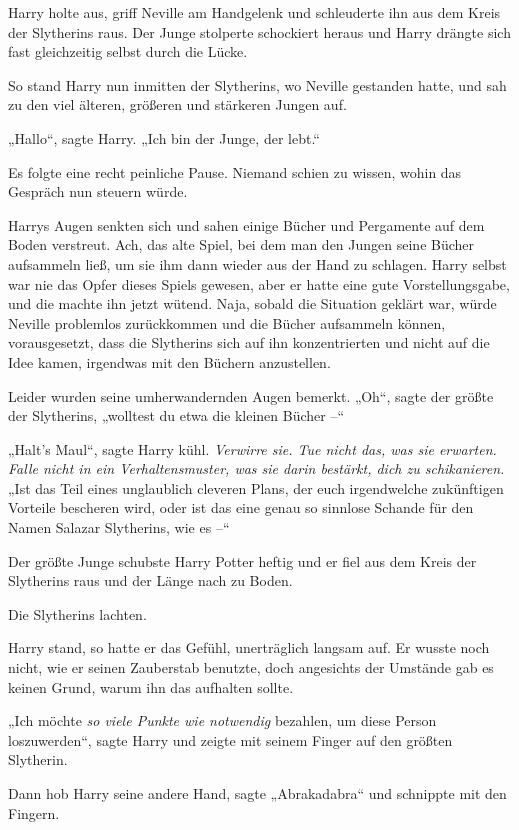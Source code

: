Harry holte aus, griff Neville am Handgelenk und schleuderte ihn aus dem Kreis der Slytherins raus. Der Junge stolperte schockiert heraus und Harry drängte sich fast gleichzeitig selbst durch die Lücke. 

So stand Harry nun inmitten der Slytherins, wo Neville gestanden hatte, und sah zu den viel älteren, größeren und stärkeren Jungen auf. 

„Hallo“, sagte Harry. „Ich bin der Junge, der lebt.“ 

Es folgte eine recht peinliche Pause. Niemand schien zu wissen, wohin das Gespräch nun steuern würde. 

Harrys Augen senkten sich und sahen einige Bücher und Pergamente auf dem Boden verstreut. Ach, das alte Spiel, bei dem man den Jungen seine Bücher aufsammeln ließ, um sie ihm dann wieder aus der Hand zu schlagen. Harry selbst war nie das Opfer dieses Spiels gewesen, aber er hatte eine gute Vorstellungsgabe, und die machte ihn jetzt wütend. Naja, sobald die Situation geklärt war, würde Neville problemlos zurückkommen und die Bücher aufsammeln können, vorausgesetzt, dass die Slytherins sich auf ihn konzentrierten und nicht auf die Idee kamen, irgendwas mit den Büchern anzustellen. 

Leider wurden seine umherwandernden Augen bemerkt. „Oh“, sagte der größte der Slytherins, „wolltest du etwa die kleinen Bücher –“ 

„Halt's Maul“, sagte Harry kühl. \emph{Verwirre sie. Tue nicht das, was sie erwarten. Falle nicht in ein Verhaltensmuster, was sie darin bestärkt, dich zu schikanieren.} „Ist das Teil eines unglaublich cleveren Plans, der euch irgendwelche zukünftigen Vorteile bescheren wird, oder ist das eine genau so sinnlose Schande für den Namen Salazar Slytherins, wie es –“ 

Der größte Junge schubste Harry Potter heftig und er fiel aus dem Kreis der Slytherins raus und der Länge nach zu Boden. 

Die Slytherins lachten. 

Harry stand, so hatte er das Gefühl, unerträglich langsam auf. Er wusste noch nicht, wie er seinen Zauberstab benutzte, doch angesichts der Umstände gab es keinen Grund, warum ihn das aufhalten sollte. 

„Ich möchte \emph{so viele Punkte wie notwendig} bezahlen, um diese Person loszuwerden“, sagte Harry und zeigte mit seinem Finger auf den größten Slytherin. 

Dann hob Harry seine andere Hand, sagte „Abrakadabra“ und schnippte mit den Fingern. 

